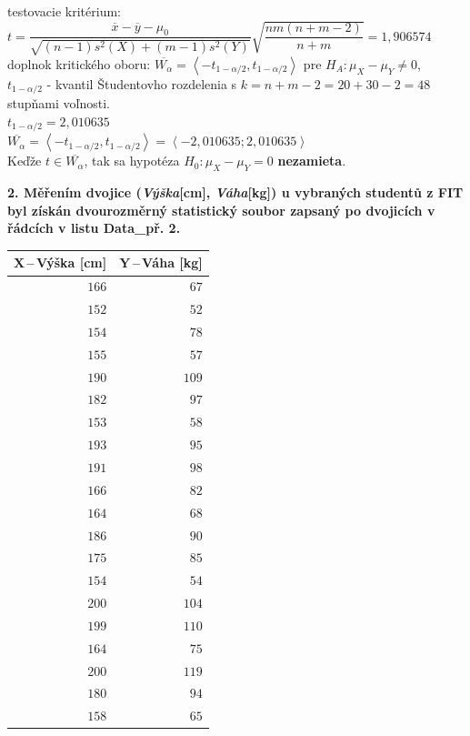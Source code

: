 \documentclass[pdftex, 11pt, a4paper, titlepage]{article}
\begin{document}
    \noindent
    testovacie kritérium: $t = \dfrac{\overline{x}-\overline{y}-\mu_0}{\sqrt{(n-1)s^2(X)+(m-1)s^2(Y)}}\sqrt{\dfrac{nm(n+m-2)}{n+m}} = 1,906574$\\
    doplnok kritického oboru: $\overline{W_\alpha} = \left\langle -t_{1-\alpha/2}, t_{1-\alpha/2} \right\rangle$ pre $H_A : \mu_X - \mu_Y \neq 0$,\\
    $t_{1-\alpha/2}$ - kvantil Študentovho rozdelenia s $k=n+m-2=20+30-2=48$ stupňami voľnosti.\\
    $t_{1-\alpha/2} = 2,010635$\\
    $\overline{W_\alpha} = \left\langle -t_{1-\alpha/2}, t_{1-\alpha/2} \right\rangle = \left\langle -2,010635 ; 2,010635 \right\rangle$\\
    Keďže $t \in \overline{W_\alpha}$, tak sa hypotéza $H_0 : \mu_X - \mu_Y = 0$ \textbf{nezamieta}.

    \newpage
    \noindent
    \textbf{2. Měřením dvojice (\emph{Výška}[cm], \emph{Váha}[kg]) u vybraných studentů
    z FIT byl získán dvourozměrný statistický soubor zapsaný po dvojicích
    v řádcích v listu Data\_př. 2.}\\

    \begin{table}[H]
		\begin{tabular}{|r|r|}
			\multicolumn{1}{c}{\textbf{$ \boldsymbol{X} $\,--\,Výška [cm]}}
			& \multicolumn{1}{c}{\textbf{$ \boldsymbol{Y} $\,--\,Váha [kg]}}
			\\ \hline

			$ 166 $ & $ 67 $ \\ \hline
			$ 152 $ & $ 52 $ \\ \hline
			$ 154 $ & $ 78 $ \\ \hline
			$ 155 $ & $ 57 $ \\ \hline
			$ 190 $ & $ 109 $ \\ \hline
			$ 182 $ & $ 97 $ \\ \hline
			$ 153 $ & $ 58 $ \\ \hline
			$ 193 $ & $ 95 $ \\ \hline
			$ 191 $ & $ 98 $ \\ \hline
			$ 166 $ & $ 82 $ \\ \hline
			$ 164 $ & $ 68 $ \\ \hline
			$ 186 $ & $ 90 $ \\ \hline
			$ 175 $ & $ 85 $ \\ \hline
			$ 154 $ & $ 54 $ \\ \hline
			$ 200 $ & $ 104 $ \\ \hline
			$ 199 $ & $ 110 $ \\ \hline
			$ 164 $ & $ 75 $ \\ \hline
			$ 200 $ & $ 119 $ \\ \hline
			$ 180 $ & $ 94 $ \\ \hline
			$ 158 $ & $ 65 $ \\ \hline
		\end{tabular}
    \end{table}
    
\end{document}
